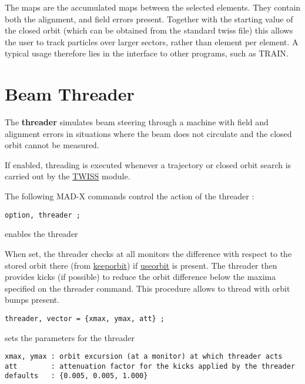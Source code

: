 The maps are the accumulated maps between the selected elements. They
contain both the alignment, and field errors present. Together with the
starting value of the closed orbit (which can be obtained from the
standard twiss file) this allows the user to track particles over larger
sectors, rather than element per element. A typical usage therefore lies
in the interface to other programs, such as TRAIN.  


%

\section{Beam Threader} 
The \textbf{threader} simulates beam steering through a machine with
field and alignment errors in situations where the beam does not
circulate and the closed orbit cannot be measured.  

If enabled, threading is executed whenever a trajectory or closed orbit
search is carried out by the \href{../twiss/twiss.html}{TWISS} module.  

The following MAD-X commands control the action of the threader :   
\begin{verbatim}
option, threader ;
\end{verbatim}  
enables the threader 

When set, the threader checks at all monitors the difference with
respect to the stored orbit there (from
\href{../twiss/twiss.html}{keeporbit}) if
\href{../twiss/twiss.html}{useorbit} is present. The threader then
provides kicks (if possible) to reduce the orbit difference below the
maxima specified on the threader command. This procedure allows to
thread with orbit bumps present.   

\begin{verbatim}
threader, vector = {xmax, ymax, att} ;
\end{verbatim}  
sets the parameters for the threader 
\begin{verbatim}
xmax, ymax : orbit excursion (at a monitor) at which threader acts
att        : attenuation factor for the kicks applied by the threader
defaults   : {0.005, 0.005, 1.000}
\end{verbatim}


